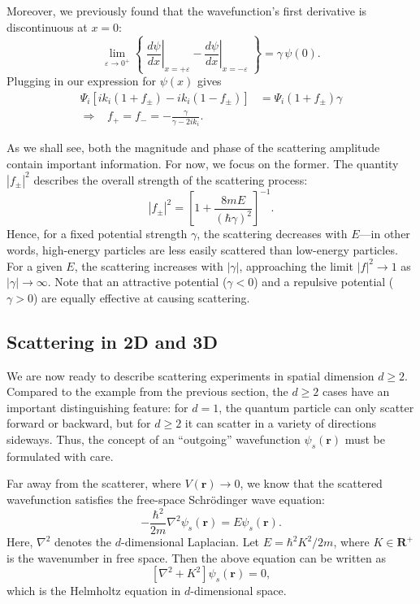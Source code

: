 \documentclass[pra,11pt]{revtex4}
\begin{document}
Moreover, we previously found that the wavefunction's first
derivative is discontinuous at $x=0$:
$$\lim_{\varepsilon\rightarrow 0^+} \left\{\; \left.\frac{d\psi}{dx}\right|_{x = +\varepsilon} - \left.\frac{d\psi}{dx}\right|_{x = -\varepsilon}\; \right\}  =  \gamma\, \psi(0).$$
Plugging in our expression for $\psi(x)$ gives
$$\begin{aligned}\Psi_i\left[ik_i(1+f_\pm) - ik_i(1-f_\pm)\right]  &=  \Psi_i(1+f_\pm) \gamma \\ \Rightarrow \;\;\; f_+ = f_- = -\frac{\gamma}{\gamma - 2ik_i}.\end{aligned}$$

As we shall see, both the magnitude and phase of the scattering
amplitude contain important information.  For now, we focus on the
former.  The quantity $|f_\pm|^2$ describes the overall strength of
the scattering process:
$$|f_\pm|^2 = \left[1 + \frac{8mE}{(\hbar\gamma)^2}\right]^{-1}.$$
Hence, for a fixed potential strength $\gamma$, the scattering
decreases with $E$---in other words, high-energy particles are less
easily scattered than low-energy particles.  For a given $E$, the
scattering increases with $|\gamma|$, approaching the limit $|f|^2
\rightarrow 1$ as $|\gamma|\rightarrow \infty$.  Note that an
attractive potential ($\gamma < 0$) and a repulsive potential ($\gamma
> 0$) are equally effective at causing scattering.

\subsection{Scattering in 2D and 3D}

We are now ready to describe scattering experiments in spatial
dimension $d \ge 2$.  Compared to the example from the previous
section, the $d \ge 2$ cases have an important distinguishing feature:
for $d = 1$, the quantum particle can only scatter forward or
backward, but for $d \ge 2$ it can scatter in a variety of directions
sideways.  Thus, the concept of an ``outgoing'' wavefunction
$\psi_s(\mathbf{r})$ must be formulated with care.

Far away from the scatterer, where $V(\mathbf{r})\rightarrow 0$, we
know that the scattered wavefunction satisfies the free-space
Schr\"odinger wave equation:
$$-\frac{\hbar^2}{2m} \nabla^2 \psi_s(\mathbf{r}) = E \psi_s(\mathbf{r}).$$
Here, $\nabla^2$ denotes the $d$-dimensional Laplacian.  Let $E =
\hbar^2 K^2 / 2m$, where $K \in \mathbf{R}^+$ is the wavenumber in
free space.  Then the above equation can be written as
$$\left[\nabla^2 + K^2\right] \psi_s(\mathbf{r}) = 0,$$
which is the Helmholtz equation in $d$-dimensional space.
\end{document}
